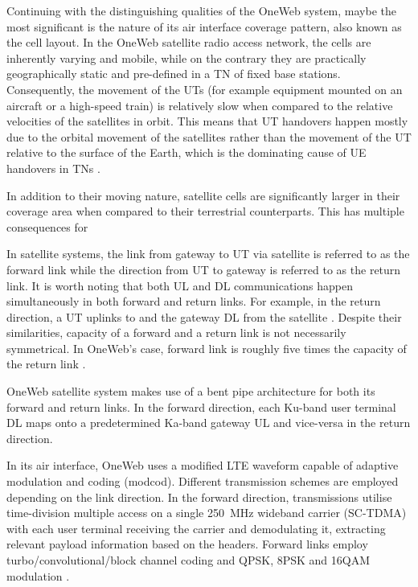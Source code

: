 \documentclass[english, 12pt, a4paper, elec, utf8, a-1b, online]{aaltothesis}
\begin{document}
Continuing with the distinguishing qualities of the OneWeb system, maybe the most significant is the nature of its air interface coverage pattern, also known as the cell layout.
In the OneWeb satellite radio access network, the cells are inherently varying and mobile, while on the contrary they are practically geographically static and pre-defined in a TN of fixed base stations.
Consequently, the movement of the UTs (for example equipment mounted on an aircraft or a high-speed train) is relatively slow when compared to the relative velocities of the satellites in orbit.
This means that UT handovers happen mostly due to the orbital movement of the satellites rather than the movement of the UT relative to the surface of the Earth, which is the dominating cause of UE handovers in TNs \cite{corson2019admission}.

In addition to their moving nature, satellite cells are significantly larger in their coverage area when compared to their terrestrial counterparts.
This has multiple consequences for \cite{corson2019admission}

In satellite systems, the link from gateway to UT via satellite is referred to as the forward link while the direction from UT to gateway is referred to as the return link.
It is worth noting that both UL and DL communications happen simultaneously in both forward and return links.
For example, in the return direction, a UT uplinks to and the gateway DL from the satellite \cite{kymeta2019link}.
Despite their similarities, capacity of a forward and a return link is not necessarily symmetrical.
In OneWeb's case, forward link is roughly five times the capacity of the return link \cite{worldvu2016loi, portillo2019technical}.

OneWeb satellite system makes use of a bent pipe architecture for both its forward and return links. In the forward direction, each Ku-band user terminal DL maps onto a predetermined Ka-band gateway UL and vice-versa in the return direction. \cite{worldvu2016loi, portillo2019technical}

In its air interface, OneWeb uses a modified LTE waveform capable of adaptive modulation and coding (modcod).
Different transmission schemes are employed depending on the link direction.
In the forward direction, transmissions utilise time-division multiple access on a single \SI{250}{\mega\hertz} wideband carrier (SC-TDMA) with each user terminal receiving the carrier and demodulating it, extracting relevant payload information based on the headers. Forward links employ turbo/convolutional/block
channel coding and QPSK, 8PSK and 16QAM modulation \cite{allen2022terrestrial, worldvu2016loi}.
\end{document}
